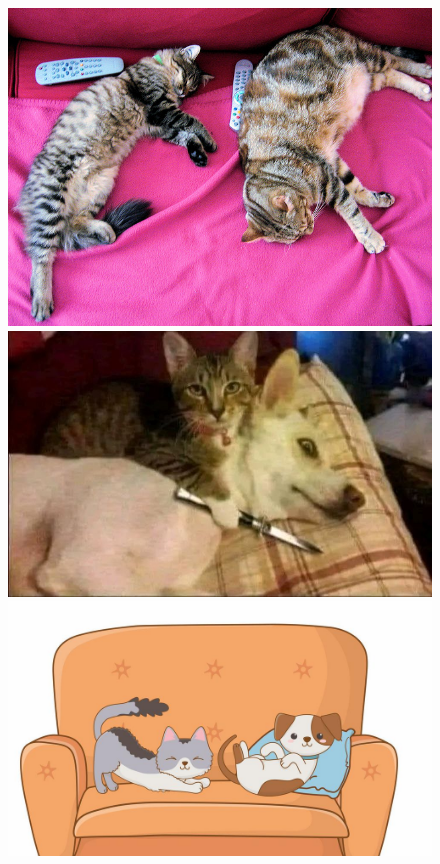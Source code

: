 \begin{figure}[H]
\centering
\begin{minipage}{0.3\textwidth}
 \includegraphics[width=\textwidth]{Graphics/Images/image_1.jpg}
 \caption{ }
 \label{fig:1}
\end{minipage}%
\begin{minipage}{0.3\textwidth}
 \includegraphics[width=\textwidth]{Graphics/Images/image_2.jpg}
 \caption{ }
 \label{fig:2}
\end{minipage}
\begin{minipage}{0.3\textwidth}
 \includegraphics[width=\textwidth]{Graphics/Images/image_3.jpg}
 \caption{ }
 \label{fig:3}
\end{minipage}
\end{figure}

